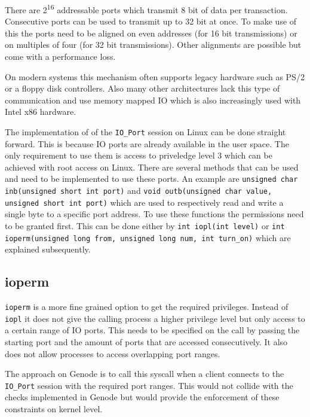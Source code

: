 \documentclass[
a4paper,
12pt,
notitlepage,
parskip=half,
DIV=11,
]{scrbook}
\begin{document}
		There are 2\textsuperscript{16} addressable ports which transmit 8 bit of data per transaction.
		Consecutive ports can be used to transmit up to 32 bit at once.
		To make use of this the ports need to be aligned on even addresses (for 16 bit transmissions) or on multiples of four (for 32 bit transmissions).
		Other alignments are possible but come with a performance loss.
		
		On modern systems this mechanism often supports legacy hardware such as PS/2 or a floppy disk controllers.
		Also many other architectures lack this type of communication and use memory mapped IO which is also increasingly used with Intel x86 hardware.
		\citep{ioports} \citep{intelmanual}
		
		The implementation of of the \texttt{IO\_Port} session on Linux can be done straight forward.
		This is because IO ports are already available in the user space.
		The only requirement to use them is access to priveledge level 3 which can be achieved with root access on Linux.
		There are several methods that can be used and need to be implemented to use these ports.
		An example are \texttt{unsigned char inb(unsigned short int port)} and \texttt{void outb(unsigned char value, unsigned short int port)} which are used to respectively read and write a single byte to a specific port address.
		To use these functions the permissions need to be granted first.
		This can be done either by \texttt{int iopl(int level)} or \texttt{int ioperm(unsigned long from, unsigned long num, int turn\_on)} which are explained subsequently. \citep{outb} \citep{ioperm} \citep{iopl}
		
		\subsection{ioperm}
		
		\texttt{ioperm} is a more fine grained option to get the required privileges.
		Instead of \texttt{iopl} it does not give the calling process a higher privilege level but only access to a certain range of IO ports.
		This needs to be specified on the call by passing the starting port and the amount of ports that are accessed consecutively.
		It also does not allow processes to access overlapping port ranges. \citep{ioperm}
		
		The approach on Genode is to call this syscall when a client connects to the \texttt{IO\_Port} session with the required port ranges.
		This would not collide with the checks implemented in Genode but would provide the enforcement of these constraints on kernel level.
				
\end{document}
